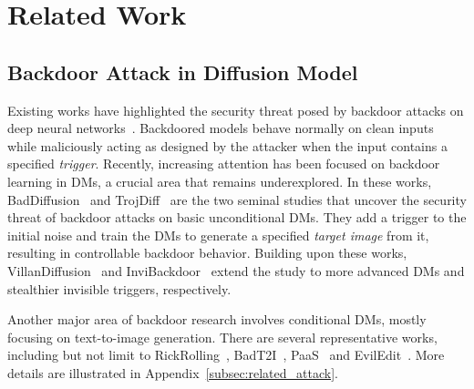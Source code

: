 \section{Related Work}
\label{sec:related}

\subsection{Backdoor Attack in Diffusion Model}
Existing works have highlighted the security threat posed by backdoor attacks on deep neural networks~\cite{gu2019badnets,wu2022backdoorbench,li2022backdoor}. Backdoored models behave normally on clean inputs while maliciously acting as designed by the attacker when the input contains a specified \textit{trigger}. 
Recently, increasing attention has been focused on backdoor learning in DMs, a crucial area that remains underexplored. 
In these works, BadDiffusion~\cite{chou2023backdoor} and TrojDiff~\cite{chen2023trojdiff} are the two seminal studies that uncover the security threat of backdoor attacks on basic unconditional DMs. 
They add a trigger to the initial noise and train the DMs to generate a specified \textit{target image} from it, resulting in controllable backdoor behavior. 
Building upon these works, VillanDiffusion~\cite{chou2024villandiffusion} and InviBackdoor~\cite{li2024invisible} extend the study to more advanced DMs and stealthier invisible triggers, respectively.

Another major area of backdoor research involves conditional DMs, mostly focusing on text-to-image generation. There are several representative works, including but not limit to RickRolling~\cite{struppek2023rickrolling}, BadT2I~\cite{zhai2023text}, PaaS~\cite{huang2024personalization} and EvilEdit~\cite{wang2024eviledit}. More details are illustrated in Appendix~\ref{subsec:related_attack}.

